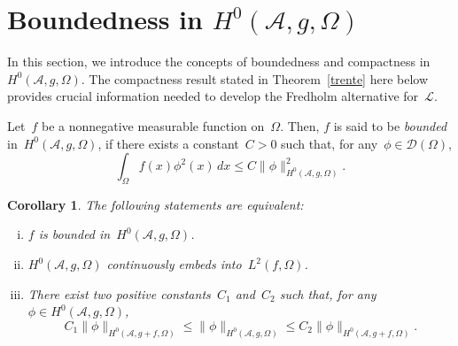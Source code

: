 \documentclass[11pt,hyp,]{nyjm}
\numberwithin{equation}{section}
\newtheorem{corollary}[theorem]{Corollary}
\theoremstyle{remark}
\newcommand{\am}{\mathcal{A}}
\renewcommand{\leq}{\leqslant}
\begin{document}
\section{Boundedness in $H^{0}(\mathcal{A}, g, \Omega)$ }\label{bounded}
				
In this section, we introduce the concepts of boundedness and compactness in~$H^{0}(\mathcal{A}, g, \Omega)$. The compactness result stated in Theorem~\ref{trente} here below provides crucial information needed to develop the Fredholm alternative for~$\mathcal{L}$.
		  
{L}et~$f$ be a nonnegative measurable function on~$\Omega$. Then, $f$ is said to be \textit{bounded} in~$H^0(\am, g, \Omega )$, if there exists a constant~$C>0$ such that, for any~$\phi \in \mathcal{D}(\Omega)$,
				\begin{equation}\label{wres}
					\int_{\Omega} f(x) \phi^2(x) \, dx \leq C \| \phi\|^2_{H^0(\am, g, \Omega )}.
				\end{equation}
				
				\begin{corollary}\label{coroinut99}
				The following statements are equivalent:
				\begin{enumerate}[(i)]
				\item $f$ is bounded in~$H^0(\am, g, \Omega )$.
				\item $H^0(\am, g, \Omega )$ continuously embeds into~$L^2(f, \Omega)$.
				\item  There exist two positive constants~$C_1$ and~$C_2$ such that, for any~$\phi \in H^0(\am, g, \Omega )$,
				\begin{equation*}
C_1 \| \phi\|_{H^{0}(\mathcal{A}, g+f, \Omega)} \leq \| \phi\|_{H^{0}(\mathcal{A}, g, \Omega)} 
\leq C_2 \|\phi\|_{H^{0}(\mathcal{A}, g+f, \Omega)}.
\end{equation*}
				\end{enumerate}
				\end{corollary}
				
\end{document}
